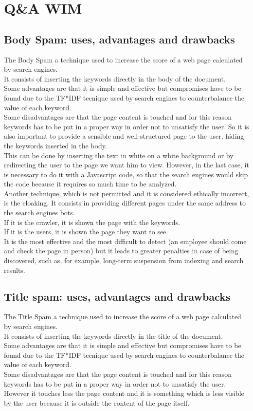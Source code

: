 \section{Q\&A WIM}
\subsection{Body Spam: uses, advantages and drawbacks}
The Body Spam a technique used to increase
the score of a web page calculated by search
engines.\\
It consists of inserting the keywords directly
in the body of the document.\\
Some advantages are that it is simple and effective
but compromises have to be found due to the TF*IDF
tecnique used by search engines to counterbalance the value of each keyword.
\\
Some disadvantages are that the page content is touched and for this reason
keywords has to be put in a proper way in order not to unsatisfy
the user.
So it is also important to provide a sensible
and well-structured page to the user, hiding the keywords inserted
in the body.\\
This can be done by inserting the text in white on a
white background or by redirecting the user to
the page we want him to view. However, in the last case, it is necessary
to do it with a Javascript code, so that the search engines would
skip the code because it requires so much time to be analyzed.\\
Another technique, which is not permitted and it is considered
ethically incorrect, is the cloaking.
It consists in providing different pages under the same address to the
search engines bots.\\
If it is the crawler, it is shown the page with the keywords.\\
If it is the users, it is shown the page they want to see.\\
It is the most effective and the most difficult to detect
(an employee should come and check the page in person)
but it leads to greater penalties in
case of being discovered, such as, for example, long-term
suspension from indexing and search results.

\subsection{Title spam: uses, advantages and drawbacks}
The Title Spam a technique used to increase
the score of a web page calculated by search
engines.\\
It consists of inserting the keywords directly
in the title of the document.\\
Some advantages are that it is simple and effective
but compromises have to be found due to the TF*IDF
tecnique used by search engines to counterbalance the value of each
keyword.\\ Some disadvantages are that the page content is touched and for this reason
keywords has to be put in a proper way in order not to unsatisfy
the user. However it touches less the page content and it is something
which is less visible by the user because it is outside the content
of the page itself.

